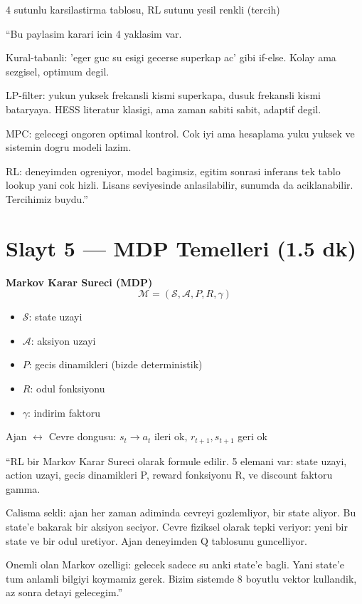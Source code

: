 \documentclass[11pt,a4paper]{article}
\begin{document}
\begin{gorselboks}
4 sutunlu karsilastirma tablosu, RL sutunu yesil renkli (tercih)
\end{gorselboks}

\begin{sayboks}
``Bu paylasim karari icin 4 yaklasim var.

Kural-tabanli: 'eger guc su esigi gecerse superkap ac' gibi if-else. Kolay ama sezgisel, optimum degil.

LP-filter: yukun yuksek frekansli kismi superkapa, dusuk frekansli kismi bataryaya. HESS literatur klasigi, ama zaman sabiti sabit, adaptif degil.

MPC: gelecegi ongoren optimal kontrol. Cok iyi ama hesaplama yuku yuksek ve sistemin dogru modeli lazim.

RL: deneyimden ogreniyor, model bagimsiz, egitim sonrasi inferans tek tablo lookup yani cok hizli. Lisans seviyesinde anlasilabilir, sunumda da aciklanabilir. Tercihimiz buydu.''
\end{sayboks}

\section{Slayt 5 --- MDP Temelleri (1.5 dk)}

\begin{slytboks}
\textbf{Markov Karar Sureci (MDP)}
\[ \mathcal{M} = (\mathcal{S}, \mathcal{A}, P, R, \gamma) \]
\begin{itemize}
\item $\mathcal{S}$: state uzayi
\item $\mathcal{A}$: aksiyon uzayi
\item $P$: gecis dinamikleri (bizde deterministik)
\item $R$: odul fonksiyonu
\item $\gamma$: indirim faktoru
\end{itemize}
\end{slytboks}

\begin{gorselboks}
Ajan $\leftrightarrow$ Cevre dongusu: $s_t \to a_t$ ileri ok, $r_{t+1}, s_{t+1}$ geri ok
\end{gorselboks}

\begin{sayboks}
``RL bir Markov Karar Sureci olarak formule edilir. 5 elemani var: state uzayi, action uzayi, gecis dinamikleri P, reward fonksiyonu R, ve discount faktoru gamma.

Calisma sekli: ajan her zaman adiminda cevreyi gozlemliyor, bir state aliyor. Bu state'e bakarak bir aksiyon seciyor. Cevre fiziksel olarak tepki veriyor: yeni bir state ve bir odul uretiyor. Ajan deneyimden Q tablosunu guncelliyor.

Onemli olan Markov ozelligi: gelecek sadece su anki state'e bagli. Yani state'e tum anlamli bilgiyi koymamiz gerek. Bizim sistemde 8 boyutlu vektor kullandik, az sonra detayi gelecegim.''
\end{sayboks}
\end{document}
